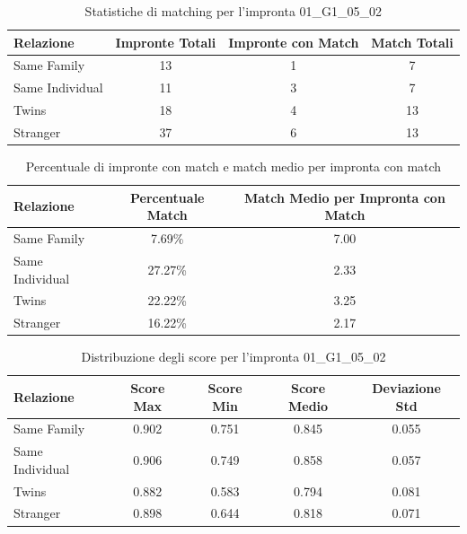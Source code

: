 \begin{table}[htbp]
\centering
\caption{Statistiche di matching per l'impronta 01\_G1\_05\_02}
\label{tab:results_01_G1_05_02}
\begin{tabular}{|l|c|c|c|}
\hline
\textbf{Relazione} & \textbf{Impronte Totali} & \textbf{Impronte con Match} & \textbf{Match Totali} \\
\hline
Same Family & 13 & 1 & 7 \\
\hline
Same Individual & 11 & 3 & 7 \\
\hline
Twins & 18 & 4 & 13 \\
\hline
Stranger & 37 & 6 & 13 \\
\hline
\end{tabular}
\end{table}


\begin{table}[htbp]
\centering
\caption{Percentuale di impronte con match e match medio per impronta con match}
\label{tab:match_percentage_01_G1_05_02}
\begin{tabular}{|l|c|c|}
\hline
\textbf{Relazione} & \textbf{Percentuale Match} & \textbf{Match Medio per Impronta con Match} \\
\hline
Same Family & 7.69\% & 7.00 \\
\hline
Same Individual & 27.27\% & 2.33 \\
\hline
Twins & 22.22\% & 3.25 \\
\hline
Stranger & 16.22\% & 2.17 \\
\hline
\end{tabular}
\end{table}


\begin{table}[htbp]
\centering
\caption{Distribuzione degli score per l'impronta 01\_G1\_05\_02}
\label{tab:scores_01_G1_05_02}
\begin{tabular}{|l|c|c|c|c|}
\hline
\textbf{Relazione} & \textbf{Score Max} & \textbf{Score Min} & \textbf{Score Medio} & \textbf{Deviazione Std} \\
\hline
Same Family & 0.902 & 0.751 & 0.845 & 0.055 \\
\hline
Same Individual & 0.906 & 0.749 & 0.858 & 0.057 \\
\hline
Twins & 0.882 & 0.583 & 0.794 & 0.081 \\
\hline
Stranger & 0.898 & 0.644 & 0.818 & 0.071 \\
\hline
\end{tabular}
\end{table}

